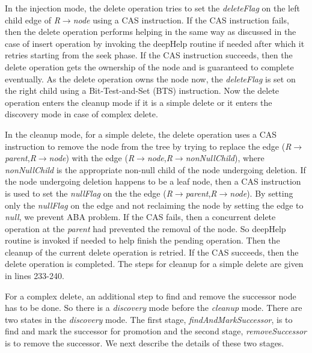 \documentclass[11pt]{article}
\begin{document}
\begin{multicols}{2}
In the injection mode, the delete operation tries to set the \textit{deleteFlag} on the left child edge of \textit{R$\rightarrow$node} using a CAS instruction. If the CAS instruction fails, then the delete operation performs helping in the same way as discussed in the case of insert operation by invoking the deepHelp routine if needed after which it retries starting from the seek phase. If the CAS instruction succeeds, then the delete operation gets the ownership of the node and is guaranteed to complete eventually. As the delete operation owns the node now, the \textit{deleteFlag} is set on the right child using a Bit-Test-and-Set (BTS) instruction. Now the delete operation enters the cleanup mode if it is a simple delete or it enters the discovery mode in case of complex delete.

In the cleanup mode, for a simple delete, the delete operation uses a CAS instruction to remove the node from the tree by trying to replace the edge (\textit{R$\rightarrow$parent},\textit{R$\rightarrow$node}) with the edge (\textit{R$\rightarrow$node},\textit{R$\rightarrow$nonNullChild}), where \textit{nonNullChild} is the appropriate non-null child of the node undergoing deletion. If the node undergoing deletion happens to be a leaf node, then a CAS instruction is used to set the \textit{nullFlag} on the the edge (\textit{R$\rightarrow$parent},\textit{R$\rightarrow$node}). By setting only the \textit{nullFlag} on the edge and not reclaiming the node by setting the edge to \textit{null}, we prevent ABA problem. If the CAS fails, then a concurrent delete operation at the \textit{parent} had prevented the removal of the node. So deepHelp routine is invoked if needed to help finish the pending operation. Then the cleanup of the current delete operation is retried. If the CAS succeeds, then the delete operation is completed. The steps for cleanup for a simple delete are given in lines 233-240.

For a complex delete, an additional step to find and remove the successor node has to be done. So there is a \textit{discovery} mode before the \textit{cleanup} mode. There are two states in the \textit{discovery} mode. The first stage, \textit{findAndMarkSuccessor}, is to find and mark the successor for promotion and the second stage, \textit{removeSuccessor} is to remove the successor. We next describe the details of these two stages.


\end{multicols}
\end{document}
